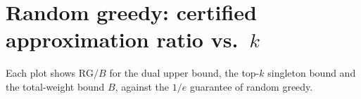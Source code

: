 \documentclass[twocolumn]{article}
\begin{document}
\section*{Random greedy: certified approximation ratio vs.\ $k$}
Each plot shows $\mathrm{RG}/B$ for the dual upper bound, the top-$k$ singleton bound and
the total-weight bound $B$, against the $1/e$ guarantee of random greedy.








\end{document}
